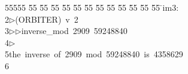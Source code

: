 %
%
\begin{tabbing}
55555 \= 55 \= 55 \= 55 \= 55 \= 55 \= 55 \= 55 \= 55 \= 55 \= 55 \= 55 \= 55 \= \>im3:\\[0pt]
2\>$\triangleright$\>(ORBITER)\ v\ 2\ \\[0pt]
3\>$\triangleright$\>$\triangleright$\>inverse\_mod\ 2909\ 59248840\\[0pt]
4\>$\triangleright$\>\\[0pt]
5\>the\ inverse\ of\ 2909\ mod\ 59248840\ is\ 4358629\\[0pt]
6\>\end{tabbing}
